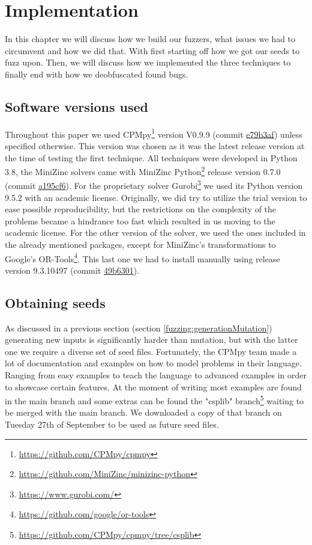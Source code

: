 \chapter{Implementation}
\label{cha:5:impl}
\label{impl:Intro}
In this chapter we will discuss how we build our fuzzers, what issues we had to circumvent and how we did that. With first starting off how we got our seeds to fuzz upon. Then, we will discuss how we implemented the three techniques to finally end with how we deobfuscated found bugs.

\section{Software versions used}
\label{impl:softwareVersion}
Throughout this paper we used CPMpy\footnote{\url{https://github.com/CPMpy/cpmpy}} version V0.9.9 (commit \href{https://github.com/CPMpy/cpmpy/commit/e79b3afedc934a9437c2ddb3a9f54d7e2d7bd3ee}{e79b3af}) unless specified otherwise. This version was chosen as it was the latest release version at the time of testing the first technique. All techniques were developed in Python 3.8, the MiniZinc solvers came with MiniZinc Python\footnote{\url{https://github.com/MiniZinc/minizinc-python}} release version 0.7.0 (commit \href{https://github.com/MiniZinc/minizinc-python/commit/a195cf63fcfbc98665d70ab64efb5424db25bd7e}{a195cf6}). For the proprietary solver Gurobi\footnote{\url{https://www.gurobi.com/}} we used its Python version 9.5.2 with an academic license. 
Originally, we did try to utilize the trial version to ease possible reproducibility, but the restrictions on the complexity of the problems became a hindrance too fast which resulted in us moving to the academic license. For the other version of the solver, we used the ones included in the already mentioned packages, except for MiniZinc's transformations to Google's OR-Tools\footnote{\url{https://github.com/google/or-tools}}. This last one we had to install manually using release version 9.3.10497 (commit \href{https://github.com/google/or-tools/commit/49b6301e1e1e231d654d79b6032e79809868a70e}{49b6301}).


\section{Obtaining seeds}
\label{impl:obtainingSeeds}
As discussed in a previous section (section \ref{fuzzing:generationMutation}) generating new inputs is significantly harder than mutation, but with the latter one we require a diverse set of seed files. Fortunately, the CPMpy team made a lot of documentation and examples on how to model problems in their language. Ranging from easy examples to teach the language to advanced examples in order to showcase certain features. 
At the moment of writing most examples are found in the main branch and some extras can be found the "csplib" branch\footnote{\url{https://github.com/CPMpy/cpmpy/tree/csplib}} waiting to be merged with the main branch. We downloaded a copy of that branch on Tuesday 27th of September to be used as future seed files. 

